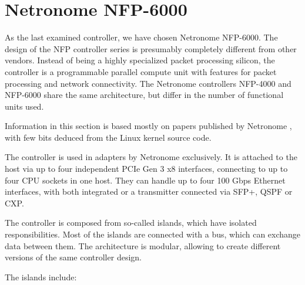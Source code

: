 \section{Netronome NFP-6000}


As the last examined controller, we have chosen Netronome NFP-6000. The design
of the NFP controller series is presumably completely different from other
vendors. Instead of being a highly specialized packet processing silicon, the
controller is a programmable parallel compute unit with features for packet
processing and network connectivity. The Netronome controllers NFP-4000 and
NFP-6000 share the same architecture, but differ in the number of functional
units used.

Information in this section is based mostly on papers published by Netronome
\cite{nfp-4k-too,nfp-prm,nfp-micro-c}, with few bits deduced from the Linux
kernel source code.

The controller is used in adapters by Netronome exclusively. It is attached to
the host via up to four independent PCIe Gen 3 x8 interfaces, connecting to up
to four CPU sockets in one host. They can handle up to four 100 Gbps Ethernet
interfaces, with both integrated  or a transmitter connected via SFP+,
QSPF or CXP.

The controller is composed from so-called islands, which have isolated
responsibilities. Most of the islands are connected with a bus, which can
exchange data between them. The architecture is modular, allowing to create
different versions of the same controller design.

The islands include:

